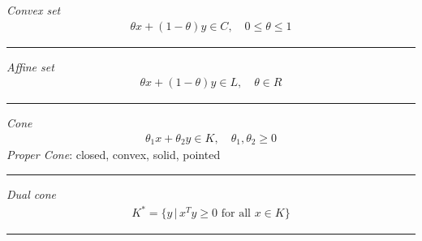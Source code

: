\noindent
\textit{Convex set}
\begin{align*}
  \theta x + (1-\theta) y \in C, \quad 0 \le \theta \le 1
\end{align*}
\rule{\linewidth}{0.1mm}

\noindent
\textit{Affine set}
\begin{align*}
  \theta x + (1-\theta) y \in L, \quad \theta \in R
\end{align*}
\rule{\linewidth}{0.1mm}

\noindent
\textit{Cone}
\begin{align*}
  \theta_1 x + \theta_2 y \in K, \quad \theta_1, \theta_2 \ge 0
\end{align*}
\textit{Proper Cone}: closed, convex, solid, pointed\\
\rule{\linewidth}{0.1mm}

\noindent
\textit{Dual cone}
\begin{align*}
  K^* = \{y \, | \, x^T y \ge 0 \mbox{ for all } x \in K\}
\end{align*}
\rule{\linewidth}{0.1mm}






